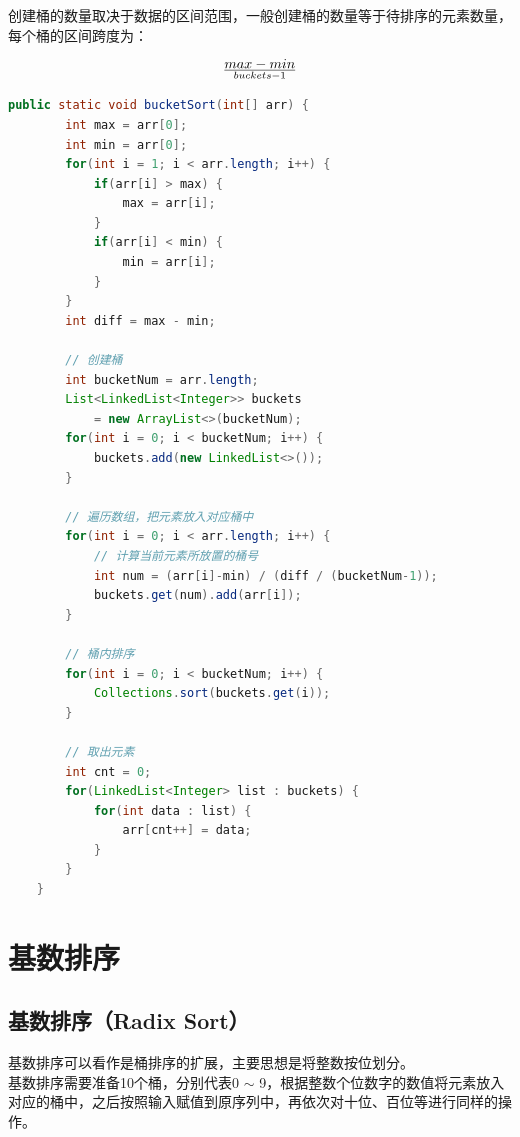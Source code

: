 创建桶的数量取决于数据的区间范围，一般创建桶的数量等于待排序的元素数量，每个桶的区间跨度为：

$$
	max - min \over buckets - 1
$$

\vspace{0.5cm}


\begin{lstlisting}[language=Java]
public static void bucketSort(int[] arr) {
        int max = arr[0];
        int min = arr[0];
        for(int i = 1; i < arr.length; i++) {
            if(arr[i] > max) {
                max = arr[i];
            }
            if(arr[i] < min) {
                min = arr[i];
            }
        }
        int diff = max - min;

        // 创建桶
        int bucketNum = arr.length;
        List<LinkedList<Integer>> buckets 
            = new ArrayList<>(bucketNum);
        for(int i = 0; i < bucketNum; i++) {
            buckets.add(new LinkedList<>());
        }

        // 遍历数组，把元素放入对应桶中
        for(int i = 0; i < arr.length; i++) {
            // 计算当前元素所放置的桶号
            int num = (arr[i]-min) / (diff / (bucketNum-1));
            buckets.get(num).add(arr[i]);
        }

        // 桶内排序
        for(int i = 0; i < bucketNum; i++) {
            Collections.sort(buckets.get(i));
        }

        // 取出元素
        int cnt = 0;
        for(LinkedList<Integer> list : buckets) {
            for(int data : list) {
                arr[cnt++] = data;
            }
        }
    }
\end{lstlisting}

\newpage

\section{基数排序}

\subsection{基数排序（Radix Sort）}

基数排序可以看作是桶排序的扩展，主要思想是将整数按位划分。\\

基数排序需要准备10个桶，分别代表0 $ \sim $ 9，根据整数个位数字的数值将元素放入对应的桶中，之后按照输入赋值到原序列中，再依次对十位、百位等进行同样的操作。

